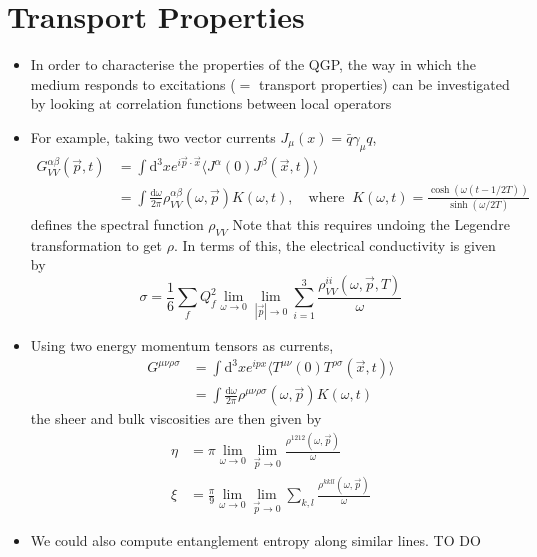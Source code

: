 \section{ Transport Properties}
\begin{itemize}
    \item In order to characterise the properties of the QGP, the way in which the medium responds to excitations ($=$ transport properties) can be investigated by looking at correlation functions between local operators
    \item For example, taking two vector currents $J_\mu(x) = \bar{q}\gamma_\mu q$,
\begin{align}
    G_{VV}^{\alpha \beta}(\vec{p}, t) &= \int \text{d}^3 x e^{i \vec{p}\cdot \vec{x}}\langle J^\alpha(0)J^\beta(\vec{x},t)\rangle \nonumber \\
    &= \int \frac{\text{d} \omega}{2 \pi}\rho_{VV}^{\alpha \beta}(\omega, \vec{p}) K(\omega, t),  \quad \text{where }\  K(\omega, t) = \frac{\cosh (\omega(t - 1/2T))}{\sinh(\omega/2T)}
\end{align}
defines the spectral function $\rho_{VV}$
Note that this requires undoing the Legendre transformation to get $\rho$. In terms of this, the electrical conductivity is given by
\begin{equation}
    \sigma = \frac{1}{6}\sum_f Q_f^2 \lim_{\omega \to 0} \lim_{|\vec{p}|\to 0} \sum_{i=1}^3 \frac{\rho_{VV}^{ii}(\omega, \vec{p}, T)}{\omega}
\end{equation}

    \item Using two energy momentum tensors as currents,
\begin{align}
    G^{\mu \nu \rho \sigma} &= \int \text{d}^3 x e^{i p x} \langle T^{\mu \nu}(0) T^{\rho \sigma}(\vec{x}, t) \rangle \nonumber \\
    &= \int \frac{\text{d} \omega}{2 \pi}\rho^{\mu \nu \rho \sigma}(\omega, \vec{p}) K(\omega, t)
\end{align}
the sheer and bulk viscosities are then given by
\begin{align}
    \eta &= \pi \lim_{\omega \to 0} \lim_{\vec{p}\to 0} \frac{\rho^{1212}(\omega, \vec{p})}{\omega}\nonumber \\
    \xi &= \frac{\pi}{9} \lim_{\omega \to 0} \lim_{\vec{p} \to 0}\sum_{k,l}\frac{\rho^{kk ll}(\omega, \vec{p})}{\omega}
\end{align}

    \item We could also compute entanglement entropy along similar lines. {\color{red} TO DO}
\end{itemize}
